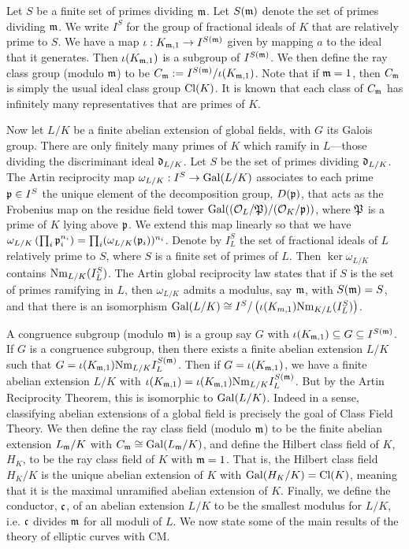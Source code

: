 Let $S$ be a finite set of primes dividing $\mathfrak{m}$. Let $S(\mathfrak{m})$ denote the set of primes dividing $\mathfrak{m}$. We write $I^S$ for the group of fractional ideals of $K$ that are relatively prime to $S$. We have a map $\iota: K_{\mathfrak{m},1} \to I^{S(\mathfrak{m})}$ given by mapping $a$ to the ideal that it generates. Then $\iota(K_{\mathfrak{m},1})$ is a subgroup of $I^{S(\mathfrak{m})}$. We then define the ray class group (modulo $\mathfrak{m}$) to be $C_{\mathfrak{m}}:= I^{S(\mathfrak{m})}/\iota(K_{\mathfrak{m},1})$. Note that if $\mathfrak{m}= 1$, then $C_{\mathfrak{m}}$ is simply the usual ideal class group $\operatorname{Cl}(K)$. It is known that each class of $C_{\mathfrak{m}}$ has infinitely many representatives that are primes of $K$. 


Now let $L/K$ be a finite abelian extension of global fields, with $G$ its Galois group. There are only finitely many primes of $K$ which ramify in $L$---those dividing the discriminant ideal $\mathfrak{d}_{L/K}$. Let $S$ be the set of primes dividing $\mathfrak{d}_{L/K}$. The Artin reciprocity map $\omega_{L/K}: I^S \to \operatorname{Gal}(L/K)$ associates to each prime $\mathfrak{p} \in I^S$ the unique element of the decomposition group, $D(\mathfrak{p})$, that acts as the Frobenius map on the residue field tower $\operatorname{Gal}((\mathcal{O}_L/\mathfrak{P})/(\mathcal{O}_K/\mathfrak{p}))$, where $\mathfrak{P}$ is a prime of $K$ lying above $\mathfrak{p}$. We extend this map linearly so that we have $\omega_{L/K}\left(\prod_i \mathfrak{p}_i^{n_i}\right)= \prod_i (\omega_{L/K}(\mathfrak{p}_i))^{n_i}$. Denote by $I_L^S$ the set of fractional ideals of $L$ relatively prime to $S$, where $S$ is a finite set of primes of $L$. Then $\ker \omega_{L/K}$ contains $\text{Nm}_{L/K}(I_L^S)$. The Artin global reciprocity law states that if $S$ is the set of primes ramifying in $L$, then $\omega_{L/K}$ admits a modulus, say $\mathfrak{m}$, with $S(\mathfrak{m})= S$, and that there is an isomorphism $\operatorname{Gal}(L/K) \cong I^S/\left(\iota(K_{m,1}) \text{Nm}_{K/L}(I_L^S) \right)$. 


A congruence subgroup (modulo $\mathfrak{m}$) is a group say $G$ with $\iota(K_{\mathfrak{m},1}) \subseteq G \subseteq I^{S(\mathfrak{m})}$. If $G$ is a congruence subgroup, then there exists a finite abelian extension $L/K$ such that $G= \iota(K_{\mathfrak{m},1}) \text{Nm}_{L/K} I_L^{S(\mathfrak{m})}$. Then if $G= \iota(K_{\mathfrak{m},1})$, we have a finite abelian extension $L/K$ with $\iota(K_{\mathfrak{m},1})= \iota(K_{\mathfrak{m},1}) \text{Nm}_{L/K} I_L^{S(\mathfrak{m})}$. But by the Artin Reciprocity Theorem, this is isomorphic to $\operatorname{Gal}(L/K)$. Indeed in a sense, classifying abelian extensions of a global field is precisely the goal of Class Field Theory. We then define the ray class field (modulo $\mathfrak{m}$) to be the finite abelian extension $L_{\mathfrak{m}}/K$ with $C_{\mathfrak{m}} \cong \operatorname{Gal}(L_{\mathfrak{m}}/K)$, and define the Hilbert class field of $K$, $H_K$, to be the ray class field of $K$ with $\mathfrak{m}= 1$. That is, the Hilbert class field $H_K/K$ is the unique abelian extension of $K$ with $\operatorname{Gal}(H_K/K)= \operatorname{Cl}(K)$, meaning that it is the maximal unramified abelian extension of $K$. Finally, we define the conductor, $\mathfrak{c}$, of an abelian extension $L/K$ to be the smallest modulus for $L/K$, i.e. $\mathfrak{c}$ divides $\mathfrak{m}$ for all moduli of $L$. We now state some of the main results of the theory of elliptic curves with CM.


